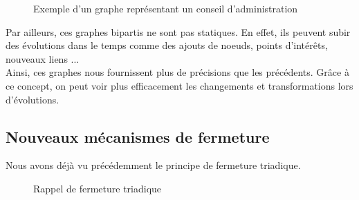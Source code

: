 \begin{figure}[h!]
\centering
{}
\caption{Exemple d'un graphe représentant un conseil d'administration}

\label{graph:grapheGoogle}
\end{figure}

Par ailleurs, ces graphes bipartis ne sont pas statiques. En effet, ils peuvent subir des évolutions dans le temps comme des ajouts de noeuds, points d'intérêts, nouveaux liens ...\\

Ainsi, ces graphes nous fournissent plus de précisions que les précédents. 
Grâce à ce concept, on peut voir plus efficacement les changements et transformations lors d'évolutions.

\subsection{Nouveaux mécanismes de fermeture}
Nous avons déjà vu précédemment le principe de fermeture triadique.\\

\begin{figure}[h!]
\centering
{}
\caption{Rappel de fermeture triadique}

\label{graph:graphe3}
\end{figure}

